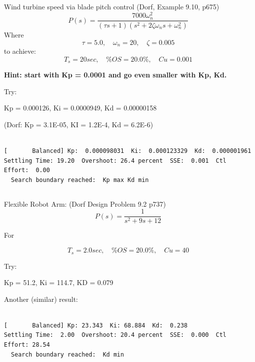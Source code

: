 \documentclass{article}	%
\begin{document}
\subsection{}
Wind turbine speed via blade pitch control (Dorf, Example 9.10, p675)
\[
P(s) = \frac {7000\omega_n^2} {(\tau s + 1)(s^2+2\zeta\omega_ns + \omega_n^2)}
\]
Where
\[
\tau = 5.0, \quad \omega_n = 20, \quad \zeta = 0.005
\]
to achieve:
\[
T_s =  20 sec, \quad \%OS = 20.0\%, \quad Cu = 0.001
\]


{\bf   Hint: start with Kp = 0.0001 and go even smaller with Kp, Kd. }

\begin{solution}
Try:

Kp = 0.000126, Ki = 0.0000949, Kd = 0.00000158

(Dorf: Kp = 3.1E-05, KI = 1.2E-4, Kd = 6.2E-6)

\begin{verbatim}

[       Balanced] Kp:  0.000098031  Ki:  0.000123329  Kd:  0.000001961
Settling Time: 19.20  Overshoot: 26.4 percent  SSE:  0.001  Ctl Effort:  0.00
  Search boundary reached:  Kp max Kd min

\end{verbatim}

\end{solution}




\subsection{}
Flexible Robot Arm: (Dorf Design Problem 9.2 p737)
\[
P(s) =   \frac {1}{s^2 + 9s + 12}
\]

For

\[
T_s =  2.0 sec, \quad \%OS = 20.0\%, \quad Cu = 40
\]

\begin{solution}

Try:

Kp = 51.2, Ki = 114.7, KD = 0.079

Another (similar) result:

\begin{verbatim}

[       Balanced] Kp: 23.343  Ki: 68.884  Kd:  0.238
Settling Time:  2.00  Overshoot: 20.4 percent  SSE:  0.000  Ctl Effort: 28.54
  Search boundary reached:  Kd min
\end{verbatim}
\end{solution}
\end{document}
